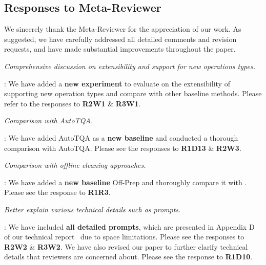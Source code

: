 \subsection*{Responses to Meta-Reviewer}

We sincerely thank the Meta-Reviewer for the appreciation of our work.  
As suggested, we have carefully addressed all detailed comments and revision requests, and have made substantial improvements throughout the paper.

\begin{shaded}
{
\emph{Comprehensive discussion on extensibility and support for new operations types.}
}
\end{shaded}

:
We have added a \textbf{new experiment} to evaluate \sys on the extensibility of supporting new operation types and compare with other baseline methods. Please refer to the responses to \textbf{R2W1} \& \textbf{R3W1}.


\begin{shaded}
{
\emph{Comparison with AutoTQA.}
}
\end{shaded}

: 
We have added AutoTQA as a \textbf{new baseline} and conducted a thorough comparison with AutoTQA. Please see the responses to \textbf{R1D13} \& \textbf{R2W3}.



\begin{shaded}
{
\emph{Comparison with offline cleaning approaches.}
}
\end{shaded}

: We have added a \textbf{new baseline} Off-Prep and thoroughly compare it with \sys. Please see the response to \textbf{R1R3}.


\begin{shaded}
{
\emph{Better explain various technical details such as prompts.}
}
\end{shaded}

: We have included \textbf{all detailed prompts}, which are presented in Appendix D of our technical report~\cite{technical_report} due to space limitations. Please see the responses to \textbf{R2W2} \& \textbf{R3W2}. We have also revised our paper to further clarify technical details that reviewers are concerned about. Please see the response to \textbf{R1D10}.


